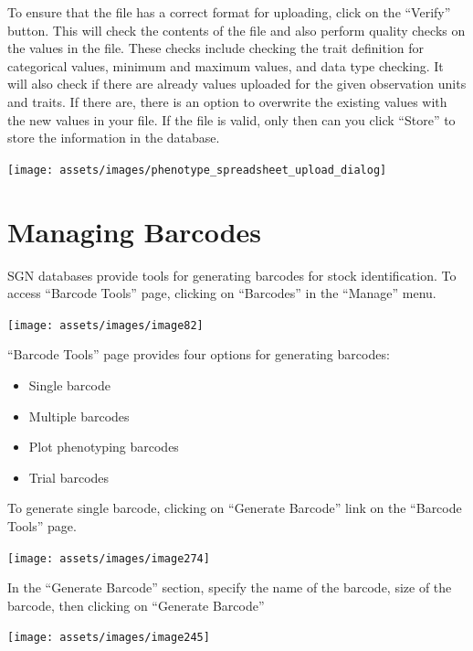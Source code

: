 \documentclass[
  12pt,
]{book}
\begin{document}
To ensure that the file has a correct format for uploading, click on the ``Verify'' button. This will check the contents of the file and also perform quality checks on the values in the file. These checks include checking the trait definition for categorical values, minimum and maximum values, and data type checking. It will also check if there are already values uploaded for the given observation units and traits. If there are, there is an option to overwrite the existing values with the new values in your file. If the file is valid, only then can you click ``Store'' to store the information in the database.

\begin{center}\texttt{[image: assets/images/phenotype\_spreadsheet\_upload\_dialog]} \end{center}

\hypertarget{managing-barcodes}{%
\chapter{Managing Barcodes}\label{managing-barcodes}}

SGN databases provide tools for generating barcodes for stock identification. To access ``Barcode Tools'' page, clicking on ``Barcodes'' in the ``Manage'' menu.

\begin{center}\texttt{[image: assets/images/image82]} \end{center}

``Barcode Tools'' page provides four options for generating barcodes:

\begin{itemize}
\item
  Single barcode
\item
  Multiple barcodes
\item
  Plot phenotyping barcodes
\item
  Trial barcodes
\end{itemize}

To generate single barcode, clicking on ``Generate Barcode'' link on the ``Barcode Tools'' page.

\begin{center}\texttt{[image: assets/images/image274]} \end{center}

In the ``Generate Barcode'' section, specify the name of the barcode, size of the barcode, then clicking on ``Generate Barcode''

\begin{center}\texttt{[image: assets/images/image245]} \end{center}
\end{document}
